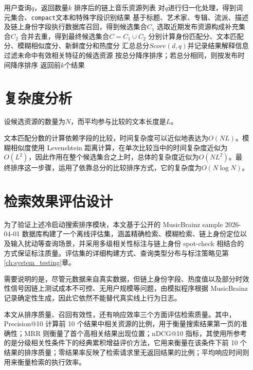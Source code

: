 \begin{algorithm}[H]
    \caption{链上音乐资源发现处理流程}
    \label{algo:chain_resource_rank_rewrite}
    \small
    \begin{algorithmic}[1]
    \Require 用户查询$q$，返回数量$k$
    \Ensure 排序后的链上音乐资源列表
    \State 对$q$进行归一化处理，得到词元集合、\texttt{compact}文本和特殊字段识别结果
    \State 基于标题、艺术家、专辑、流派、描述及链上身份字段执行数据库召回，得到候选集合$C_1$
    \State 选取近期发布资源构成补充集合$C_2$
    \State 合并去重，得到最终候选集合$C=C_1\cup C_2$
        \State 分别计算身份匹配分、文本匹配分、模糊相似度分、新鲜度分和热度分
        \State 汇总总分$Score(d,q)$并记录结果解释信息
    \EndFor
    \State 过滤未命中有效相关特征的候选资源
    \State 按总分降序排序；若总分相同，则按发布时间降序排序
    \State 返回前$k$个结果
    \end{algorithmic}
\end{algorithm}


\section{复杂度分析}

设候选资源的数量为$N$，而平均参与比较的文本长度是$L$。

文本匹配分数的计算依赖字段的比较，时间复杂度可以近似地表达为$O(NL)$。模糊相似度使用 Levenshtein 距离计算，在单次比较当中的时间复杂度近似为$O(L^2)$，因此作用在整个候选集合之上时，总体的复杂度近似为$O(NL^2)$。最终排序这一步骤，运用了依靠总分的比较排序方式，它的复杂度为$O(N\log N)$。


\section{检索效果评估设计}

为了验证上述冷启动搜索排序模块，本文基于公开的 MusicBrainz sample 2026-04-01 数据库构建了一个离线评估集\cite{musicbrainzDatabase,musicbrainzDataDownload}，涵盖精确检索、模糊检索、链上身份定位以及输入扰动等查询场景，并采用多级相关性标注与链上身份 spot-check 相结合的方式保证标注质量。评估集的详细构建方式、查询类型分布与标注策略见第\ref{ch:system_testing}章。


需要说明的是，尽管元数据来自真实数据，但链上身份字段、热度值以及部分时效性信号因链上测试成本不可控、无用户规模等问题，由模拟程序根据 MusicBrainz 记录确定性生成，因此它依然不能替代真实线上行为日志。

本文从排序质量、召回有效性，还有响应效率三个方面评估检索质量。其中，Precision@10 计算前 10 个结果中相关资源的比例，用于衡量搜索结果第一页的准确性；MRR 则衡量了首个高相关结果出现位置；nDCG@10 指标，其使用所参考的是分级相关性条件下的经典累积增益评价方法\cite{Jarvelin2002CG}，它用来衡量在该条件下前 10 个结果的排序质量；零结果率反映了检索请求里无返回结果的比例；平均响应时间则用来衡量检索的执行效率。

